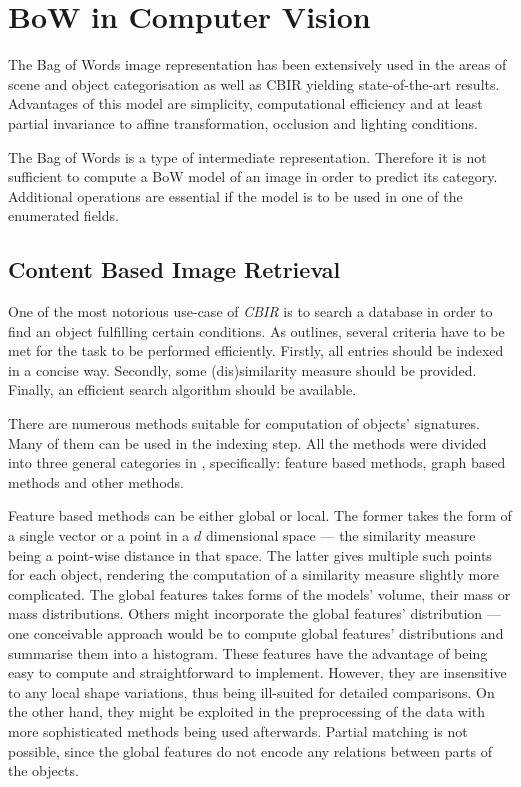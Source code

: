 \documentclass[a4paper,12pt]{article}
\begin{document}
\section{BoW in Computer Vision}

  The Bag of Words image representation has been extensively used in the areas of scene \cite{csurka2004visual,fei2005bayesian, tsai2012bag} and object categorisation \cite{zhangcategory} as well as CBIR \cite{li2010investigating,toldo2009bag} yielding state-of-the-art results. Advantages of this model are simplicity, computational efficiency and at least partial invariance to affine transformation, occlusion and lighting conditions. 
  
  The Bag of Words is a type of intermediate representation. Therefore it is not sufficient to compute a BoW model of an image in order to predict its category. Additional operations are essential if the model is to be used in one of the enumerated fields.
  
  \subsection{Content Based Image Retrieval}
  
  One of the most notorious use-case of \emph{CBIR} is to search a database in order to find an object fulfilling certain conditions. As \cite{toldo2009bag} outlines, several criteria have to be met for the task to be performed efficiently. Firstly, all entries should be indexed in a concise way. Secondly, some (dis)similarity measure should be provided. Finally, an efficient search algorithm should be available.  
    
  There are numerous methods suitable for computation of objects' signatures. Many of them can be used in the indexing step. All the methods were divided into three general categories in \cite{toldo2009bag}, specifically: feature based methods, graph based methods and other methods. 
   
  Feature based methods can be either global or local. The former takes the form of a single vector or a point in a $d$ dimensional space --- the similarity measure being a point-wise distance in that space. The latter gives multiple such points for each object, rendering the computation of a similarity measure slightly more complicated. The global features takes forms of the models' volume, their mass or mass distributions. Others might incorporate the global features' distribution --- one conceivable approach would be to compute global features' distributions and summarise them into a histogram. These features have the advantage of being easy to compute and straightforward to implement. However, they are insensitive to any local shape variations, thus being ill-suited for detailed comparisons. On the other hand, they might be exploited in the preprocessing of the data with more sophisticated methods being used afterwards. Partial matching is not possible, since the global features do not encode any relations between parts of the objects.
   
\end{document}
